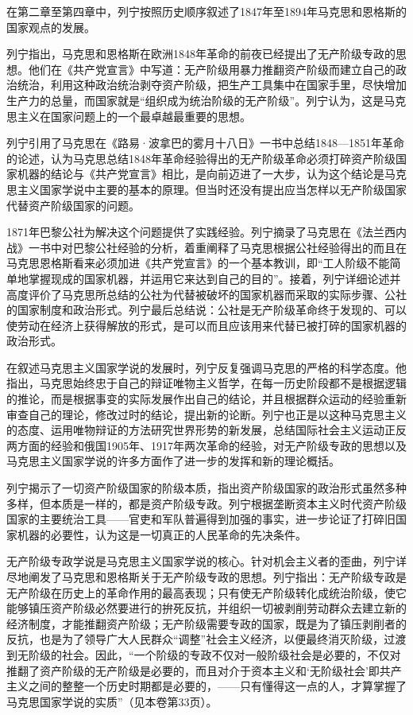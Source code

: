 \documentclass[UTF8, 12pt, a4paper]{ctexrep}
\begin{document}
在第二章至第四章中，列宁按照历史顺序叙述了1847年至1894年马克思和恩格斯的国家观点的发展。

列宁指出，马克思和恩格斯在欧洲1848年革命的前夜已经提出了无产阶级专政的思想。他们在《共产党宣言》中写道：无产阶级用暴力推翻资产阶级而建立自己的政治统治，利用这种政治统治剥夺资产阶级，把生产工具集中在国家手里，尽快增加生产力的总量，而国家就是“组织成为统治阶级的无产阶级”。列宁认为，这是马克思主义在国家问题上的一个最卓越最重要的思想。

列宁引用了马克思在《路易·波拿巴的雾月十八日》一书中总结1848—1851年革命的论述，认为马克思总结1848年革命经验得出的无产阶级革命必须打碎资产阶级国家机器的结论与《共产党宣言》相比，是向前迈进了一大步，认为这个结论是马克思主义国家学说中主要的基本的原理。但当时还没有提出应当怎样以无产阶级国家代替资产阶级国家的问题。

1871年巴黎公社为解决这个问题提供了实践经验。列宁摘录了马克思在《法兰西内战》一书中对巴黎公社经验的分析，着重阐释了马克思根据公社经验得出的而且在马克思恩格斯看来必须加进《共产党宣言》的一个基本教训，即“工人阶级不能简单地掌握现成的国家机器，并运用它来达到自己的目的”。接着，列宁详细论述并高度评价了马克思所总结的公社为代替被破坏的国家机器而采取的实际步骤、公社的国家制度和政治形式。列宁最后总结说：公社是无产阶级革命终于发现的、可以使劳动在经济上获得解放的形式，是可以而且应该用来代替已被打碎的国家机器的政治形式。

在叙述马克思主义国家学说的发展时，列宁反复强调马克思的严格的科学态度。他指出，马克思始终忠于自己的辩证唯物主义哲学，在每一历史阶段都不是根据逻辑的推论，而是根据事变的实际发展作出自己的结论，并且根据群众运动的经验重新审查自己的理论，修改过时的结论，提出新的论断。列宁也正是以这种马克思主义的态度、运用唯物辩证的方法研究世界形势的新发展，总结国际社会主义运动正反两方面的经验和俄国1905年、1917年两次革命的经验，对无产阶级专政的思想以及马克思主义国家学说的许多方面作了进一步的发挥和新的理论概括。

列宁揭示了一切资产阶级国家的阶级本质，指出资产阶级国家的政治形式虽然多种多样，但本质是一样的，都是资产阶级专政。列宁根据垄断资本主义时代资产阶级国家的主要统治工具——官吏和军队普遍得到加强的事实，进一步论证了打碎旧国家机器的必要性，认为这是一切真正的人民革命的先决条件。

无产阶级专政学说是马克思主义国家学说的核心。针对机会主义者的歪曲，列宁详尽地阐发了马克思和恩格斯关于无产阶级专政的思想。列宁指出：无产阶级专政是无产阶级在历史上的革命作用的最高表现；只有使无产阶级转化成统治阶级，使它能够镇压资产阶级必然要进行的拚死反抗，并组织一切被剥削劳动群众去建立新的经济制度，才能推翻资产阶级；无产阶级需要专政的国家，既是为了镇压剥削者的反抗，也是为了领导广大人民群众“调整”社会主义经济，以便最终消灭阶级，过渡到无阶级的社会。因此，“一个阶级的专政不仅对一般阶级社会是必要的，不仅对推翻了资产阶级的无产阶级是必要的，而且对介于资本主义和‘无阶级社会’即共产主义之间的整整一个历史时期都是必要的，——只有懂得这一点的人，才算掌握了马克思国家学说的实质”（见本卷第33页）。
\end{document}
